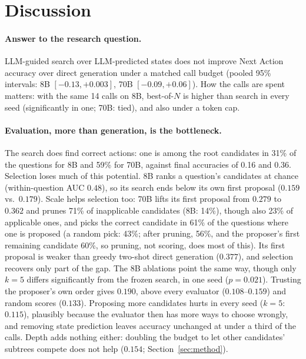 \section{Discussion}
\label{sec:discussion}

\paragraph{Answer to the research question.}
LLM-guided search over LLM-predicted states does not improve Next Action accuracy over direct
generation under a matched call budget (pooled 95\% intervals: 8B $[-0.13, +0.003]$, 70B $[-0.09, +0.06]$). How the calls are
spent matters: with the same 14 calls on 8B, best-of-$N$ is higher than search in every seed (significantly in one; 70B: tied), and also under a token cap.

\paragraph{Evaluation, more than generation, is the bottleneck.}
The search does find correct actions: one is among the root candidates in 31\% of the questions for
8B and 59\% for 70B, against final accuracies of 0.16 and 0.36. Selection loses much of this potential. 8B ranks a question's candidates at chance (within-question AUC $0.48$), so its search ends below its own first proposal ($0.159$ vs.\ $0.179$). Scale helps selection too: 70B lifts its first proposal from $0.279$ to $0.362$ and prunes 71\% of inapplicable candidates (8B: 14\%), though also 23\% of applicable ones, and picks the correct candidate in 61\% of the questions where one is proposed (a random pick: 43\%; after pruning, 56\%, and the proposer's first remaining candidate 60\%, so pruning, not scoring, does most of this). Its first proposal is weaker than greedy two-shot direct generation ($0.377$), and selection recovers only part of the gap. The 8B ablations point the same way, though only $k{=}5$ differs significantly from the frozen search, in one seed ($p = 0.021$). Trusting the proposer's own order gives $0.190$, above every evaluator ($0.108$--$0.159$) and random scores ($0.133$). Proposing more candidates hurts in every seed ($k{=}5$: $0.115$), plausibly because the evaluator then has more ways to choose wrongly, and removing
state prediction leaves accuracy unchanged at under a third of the calls. Depth adds nothing either: doubling the budget to let other candidates' subtrees compete does not help ($0.154$; Section~\ref{sec:method}). 

